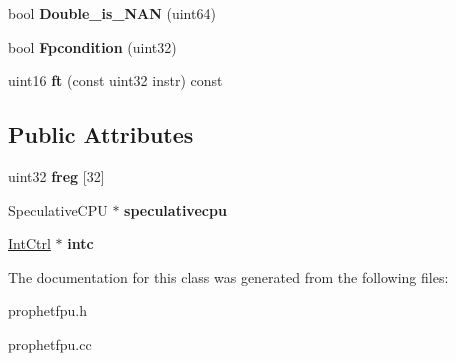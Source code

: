 \begin{DoxyCompactItemize}
\item 
\hypertarget{classFPU_ac2c3bf00c3a2c1c1fe81f1dd44b446ac}{
bool {\bfseries Double\_\-is\_\-NAN} (uint64)}
\label{classFPU_ac2c3bf00c3a2c1c1fe81f1dd44b446ac}

\item 
\hypertarget{classFPU_a33b65557a53a4e30657bc9cbb6e43a63}{
bool {\bfseries Fpcondition} (uint32)}
\label{classFPU_a33b65557a53a4e30657bc9cbb6e43a63}

\item 
\hypertarget{classFPU_aebbaa139c9609776428483b9b44f3da9}{
uint16 {\bfseries ft} (const uint32 instr) const }
\label{classFPU_aebbaa139c9609776428483b9b44f3da9}

\end{DoxyCompactItemize}
\subsection*{Public Attributes}
\begin{DoxyCompactItemize}
\item 
\hypertarget{classFPU_a55769238d4733e7f9ac6c2b49d467e62}{
uint32 {\bfseries freg} \mbox{[}32\mbox{]}}
\label{classFPU_a55769238d4733e7f9ac6c2b49d467e62}

\item 
\hypertarget{classFPU_a2cd01292739db9bfd89ea10fc9d6ed2c}{
SpeculativeCPU $\ast$ {\bfseries speculativecpu}}
\label{classFPU_a2cd01292739db9bfd89ea10fc9d6ed2c}

\item 
\hypertarget{classFPU_aea75f0e2d3c4914c567d87d9f7a63a39}{
\hyperlink{classIntCtrl}{IntCtrl} $\ast$ {\bfseries intc}}
\label{classFPU_aea75f0e2d3c4914c567d87d9f7a63a39}

\end{DoxyCompactItemize}


The documentation for this class was generated from the following files:\begin{DoxyCompactItemize}
\item 
prophetfpu.h\item 
prophetfpu.cc\end{DoxyCompactItemize}
